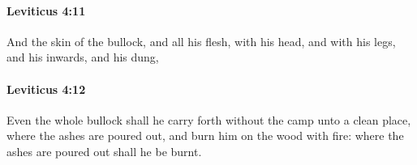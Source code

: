 		\paragraph{Leviticus 4:11} %
			\label{LEVITICUS-4-11}

			And the skin of the bullock, and all his flesh, with his head, and with his legs, and his inwards, and his dung,


		\paragraph{Leviticus 4:12} %
			\label{LEVITICUS-4-12}

			Even the whole bullock shall he carry forth without the camp unto a clean place, where the ashes are poured out, and burn him on the wood with fire: where the ashes are poured out shall he be burnt.


